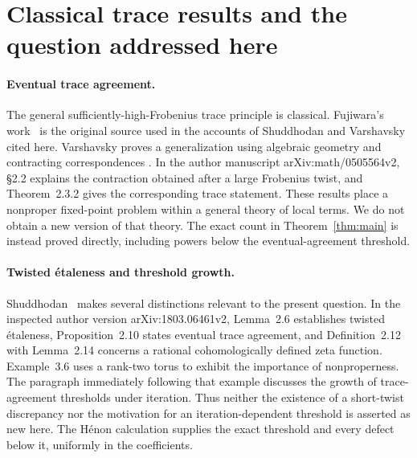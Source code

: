 \section{Classical trace results and the question addressed here}\label{sec:context}

\paragraph{Eventual trace agreement.}
The general sufficiently-high-Frobenius trace principle is classical.
Fujiwara's work~\cite{fujiwara1997rigid} is the original source used in
the accounts of Shuddhodan and Varshavsky cited here. Varshavsky proves a
generalization using algebraic geometry and contracting correspondences
\cite{varshavsky2007trace}. In the author manuscript
arXiv:math/0505564v2, \S2.2 explains the contraction obtained after a large
Frobenius twist, and Theorem~2.3.2 gives the corresponding trace statement.
These results place a nonproper fixed-point problem within a general
theory of local terms. We do not obtain a new version of that theory.
The exact count in Theorem~\ref{thm:main} is instead proved directly,
including powers below the eventual-agreement threshold.

\paragraph{Twisted \texorpdfstring{\'etaleness}{etaleness} and threshold growth.}
Shuddhodan~\cite{shuddhodan2019constraints} makes several distinctions
relevant to the present question. In the inspected author version
arXiv:1803.06461v2, Lemma~2.6 establishes twisted \'etaleness,
Proposition~2.10 states eventual trace agreement, and Definition~2.12
with Lemma~2.14 concerns a rational cohomologically defined zeta function.
Example~3.6 uses a rank-two torus to exhibit the importance of
nonproperness. The paragraph immediately following that example discusses
the growth of trace-agreement thresholds under iteration. Thus neither
the existence of a short-twist discrepancy nor the motivation for an
iteration-dependent threshold is asserted as new here. The H\'enon
calculation supplies the exact threshold and every defect below it,
uniformly in the coefficients.

